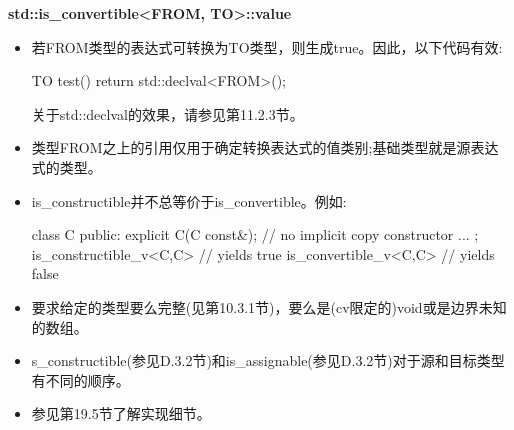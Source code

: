 \textbf{std::is\_convertible<FROM, TO>::value}

\begin{itemize}
\item
若FROM类型的表达式可转换为TO类型，则生成true。因此，以下代码有效:

\begin{cpp}
TO test() {
	return std::declval<FROM>();
}
\end{cpp}

\begin{notice}
关于std::declval的效果，请参见第11.2.3节。
\end{notice}

\item
类型FROM之上的引用仅用于确定转换表达式的值类别;基础类型就是源表达式的类型。

\item
is\_constructible并不总等价于is\_convertible。例如:

\begin{cpp}
class C {
	public:
	explicit C(C const&); // no implicit copy constructor
	...
};
is_constructible_v<C,C> // yields true
is_convertible_v<C,C> // yields false
\end{cpp}

\item
要求给定的类型要么完整(见第10.3.1节)，要么是(cv限定的)void或是边界未知的数组。

\item
s\_constructible(参见D.3.2节)和is\_assignable(参见D.3.2节)对于源和目标类型有不同的顺序。

\item
参见第19.5节了解实现细节。
\end{itemize}